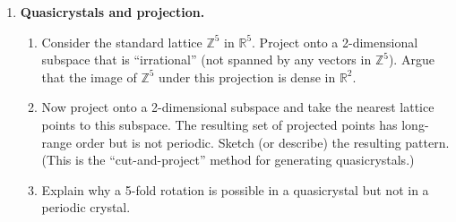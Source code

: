 \begin{enumerate}
    \item[$\star$] \textbf{Quasicrystals and projection.}
    \begin{enumerate}
        \item Consider the standard lattice $\mathbb{Z}^5$ in $\mathbb{R}^5$. Project onto a 2-dimensional subspace that is ``irrational'' (not spanned by any vectors in $\mathbb{Z}^5$). Argue that the image of $\mathbb{Z}^5$ under this projection is dense in $\mathbb{R}^2$.
        \item Now project onto a 2-dimensional subspace and take the nearest lattice points to this subspace. The resulting set of projected points has long-range order but is not periodic. Sketch (or describe) the resulting pattern. (This is the ``cut-and-project'' method for generating quasicrystals.)
        \item Explain why a 5-fold rotation is possible in a quasicrystal but not in a periodic crystal.
    \end{enumerate}

\end{enumerate}
